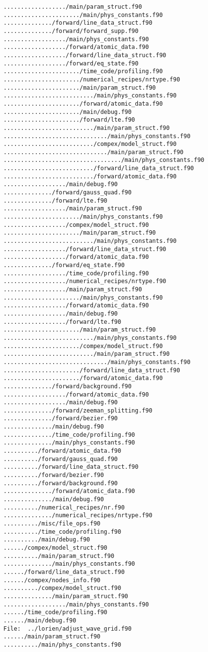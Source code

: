 \begin{verbatim}
................../main/param_struct.f90
....................../main/phys_constants.f90
............../forward/line_data_struct.f90
............../forward/forward_supp.f90
................../main/phys_constants.f90
................../forward/atomic_data.f90
................../forward/line_data_struct.f90
................../forward/eq_state.f90
....................../time_code/profiling.f90
....................../numerical_recipes/nrtype.f90
....................../main/param_struct.f90
........................../main/phys_constants.f90
....................../forward/atomic_data.f90
....................../main/debug.f90
....................../forward/lte.f90
........................../main/param_struct.f90
............................../main/phys_constants.f90
........................../compex/model_struct.f90
............................../main/param_struct.f90
................................../main/phys_constants.f90
........................../forward/line_data_struct.f90
........................../forward/atomic_data.f90
................../main/debug.f90
............../forward/gauss_quad.f90
............../forward/lte.f90
................../main/param_struct.f90
....................../main/phys_constants.f90
................../compex/model_struct.f90
....................../main/param_struct.f90
........................../main/phys_constants.f90
................../forward/line_data_struct.f90
................../forward/atomic_data.f90
............../forward/eq_state.f90
................../time_code/profiling.f90
................../numerical_recipes/nrtype.f90
................../main/param_struct.f90
....................../main/phys_constants.f90
................../forward/atomic_data.f90
................../main/debug.f90
................../forward/lte.f90
....................../main/param_struct.f90
........................../main/phys_constants.f90
....................../compex/model_struct.f90
........................../main/param_struct.f90
............................../main/phys_constants.f90
....................../forward/line_data_struct.f90
....................../forward/atomic_data.f90
............../forward/background.f90
................../forward/atomic_data.f90
................../main/debug.f90
............../forward/zeeman_splitting.f90
............../forward/bezier.f90
............../main/debug.f90
............../time_code/profiling.f90
............../main/phys_constants.f90
........../forward/atomic_data.f90
........../forward/gauss_quad.f90
........../forward/line_data_struct.f90
........../forward/bezier.f90
........../forward/background.f90
............../forward/atomic_data.f90
............../main/debug.f90
........../numerical_recipes/nr.f90
............../numerical_recipes/nrtype.f90
........../misc/file_ops.f90
........../time_code/profiling.f90
........../main/debug.f90
....../compex/model_struct.f90
........../main/param_struct.f90
............../main/phys_constants.f90
....../forward/line_data_struct.f90
....../compex/nodes_info.f90
........../compex/model_struct.f90
............../main/param_struct.f90
................../main/phys_constants.f90
....../time_code/profiling.f90
....../main/debug.f90
File:  ../lorien/adjust_wave_grid.f90
....../main/param_struct.f90
........../main/phys_constants.f90
\end{verbatim}

